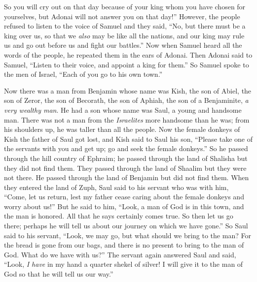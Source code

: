 \begin{biblechapter}
\verse So you will cry out on that day because of your king whom you have chosen for yourselves, but Adonai will not answer you on that day!”
\verse However, the people refused to listen to the voice of Samuel and they said, “No, but there must be a king over us,
\verse so that we \textit{also} may be like all the nations, and our king may rule us and go out before us and fight our battles.”
\verse Now when Samuel heard all the words of the people, he repeated them in the ears of Adonai.
\verse Then Adonai said to Samuel, “Listen to their voice, and appoint a king for them.” So Samuel spoke to the men of Israel, “Each of you go to his own town.”
\end{biblechapter}

\begin{biblechapter} %
 Now there was a man from Benjamin whose name was Kish, the son of Abiel, the son of Zeror, the son of Becorath, the son of Aphiah, the son of a Benjaminite, \textit{a very wealthy man}.
\verse He had a son whose name was Saul, a young and handsome man. There was not a man from the \textit{Israelites} more handsome than he was; from his shoulders up, he was taller than all the people.
\verse Now the female donkeys of Kish the father of Saul got lost, and Kish said to Saul his son, “Please take one of the servants with you and get up; go and seek the female donkeys.”
\verse So he passed through the hill country of Ephraim; he passed through the land of Shalisha but they did not find them. They passed through the land of Shaalim but they were not there. He passed through the land of Benjamin but did not find them.
\verse When they entered the land of Zuph, Saul said to his servant who was with him, “Come, let us return, lest my father cease caring about the female donkeys and worry about us!”
\verse But he said to him, “Look, a man of God is in this town, and the man is honored. All that he says certainly comes true. So then let us go there; perhaps he will tell us about our journey on which we have gone.”
\verse So Saul said to his servant, “Look, we may go, but what should we bring to the man? For the bread is gone from our bags, and there is no present to bring to the man of God. What do we have with us?”
\verse The servant again answered Saul and said, “Look, \textit{I have} in my hand a quarter shekel of silver! I will give it to the man of God so that he will tell us our way.”

\end{biblechapter}
